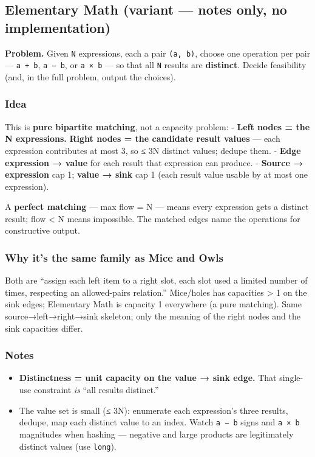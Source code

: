 \documentclass[
  10pt,
  letterpaper,
  onecolumn]{article}
\providecommand{\tightlist}{%
  \setlength{\itemsep}{0pt}\setlength{\parskip}{0pt}}
\begin{document}
\hypertarget{elementary-math-variant-notes-only-no-implementation}{%
\subsection{Elementary Math (variant --- notes only, no
implementation)}\label{elementary-math-variant-notes-only-no-implementation}}

\textbf{Problem.} Given \texttt{N} expressions, each a pair
\texttt{(a,\ b)}, choose one operation per pair --- \texttt{a\ +\ b},
\texttt{a\ −\ b}, or \texttt{a\ ×\ b} --- so that all \texttt{N} results
are \textbf{distinct}. Decide feasibility (and, in the full problem,
output the choices).

\hypertarget{idea-19}{%
\subsubsection{Idea}\label{idea-19}}

This is \textbf{pure bipartite matching}, not a capacity problem: -
\textbf{Left nodes = the N expressions.} \textbf{Right nodes = the
candidate result values} --- each expression contributes at most 3, so ≤
3N distinct values; dedupe them. - \textbf{Edge expression → value} for
each result that expression can produce. - \textbf{Source → expression}
cap 1; \textbf{value → sink} cap 1 (each result value usable by at most
one expression).

A \textbf{perfect matching} --- max flow = N --- means every expression
gets a distinct result; flow \textless{} N means impossible. The matched
edges name the operations for constructive output.

\hypertarget{why-its-the-same-family-as-mice-and-owls}{%
\subsubsection{Why it's the same family as Mice and
Owls}\label{why-its-the-same-family-as-mice-and-owls}}

Both are ``assign each left item to a right slot, each slot used a
limited number of times, respecting an allowed-pairs relation.''
Mice/holes has capacities \textgreater{} 1 on the sink edges; Elementary
Math is capacity 1 everywhere (a pure matching). Same
source→left→right→sink skeleton; only the meaning of the right nodes and
the sink capacities differ.

\hypertarget{notes-17}{%
\subsubsection{Notes}\label{notes-17}}

\begin{itemize}
\tightlist
\item
  \textbf{Distinctness = unit capacity on the value → sink edge.} That
  single-use constraint \emph{is} ``all results distinct.''
\item
  The value set is small (≤ 3N): enumerate each expression's three
  results, dedupe, map each distinct value to an index. Watch
  \texttt{a\ −\ b} signs and \texttt{a\ ×\ b} magnitudes when hashing
  --- negative and large products are legitimately distinct values (use
  \texttt{long}).
\end{itemize}
\end{document}
